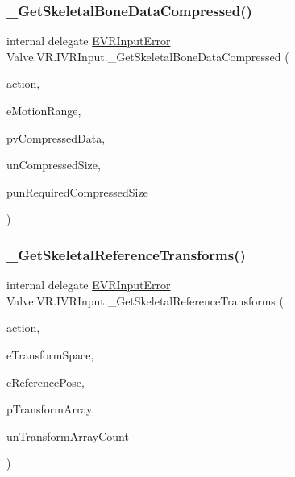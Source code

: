 \mbox{\label{struct_valve_1_1_v_r_1_1_i_v_r_input_ac9cf8a486d0d66c088c2eb33b722111d}} 
\subsubsection{\texorpdfstring{\_GetSkeletalBoneDataCompressed()}{\_GetSkeletalBoneDataCompressed()}}
{\footnotesize\ttfamily internal delegate \mbox{\hyperlink{namespace_valve_1_1_v_r_a592d7f4189b8346d6c96dbdbaa35bc1b}{E\+V\+R\+Input\+Error}} Valve.\+V\+R.\+I\+V\+R\+Input.\+\_\+\+Get\+Skeletal\+Bone\+Data\+Compressed (\begin{DoxyParamCaption}\item[{ulong}]{action,  }\item[{\mbox{\hyperlink{namespace_valve_1_1_v_r_affc8d18345f8f5d36f1ae7b4ce534500}{E\+V\+R\+Skeletal\+Motion\+Range}}}]{e\+Motion\+Range,  }\item[{Int\+Ptr}]{pv\+Compressed\+Data,  }\item[{uint}]{un\+Compressed\+Size,  }\item[{ref uint}]{pun\+Required\+Compressed\+Size }\end{DoxyParamCaption})}

\mbox{\label{struct_valve_1_1_v_r_1_1_i_v_r_input_a1d1f340254e37a3037714eb5ee548afd}} 
\subsubsection{\texorpdfstring{\_GetSkeletalReferenceTransforms()}{\_GetSkeletalReferenceTransforms()}}
{\footnotesize\ttfamily internal delegate \mbox{\hyperlink{namespace_valve_1_1_v_r_a592d7f4189b8346d6c96dbdbaa35bc1b}{E\+V\+R\+Input\+Error}} Valve.\+V\+R.\+I\+V\+R\+Input.\+\_\+\+Get\+Skeletal\+Reference\+Transforms (\begin{DoxyParamCaption}\item[{ulong}]{action,  }\item[{\mbox{\hyperlink{namespace_valve_1_1_v_r_a916744fb3fc7b8e8ba224fba9bee6de4}{E\+V\+R\+Skeletal\+Transform\+Space}}}]{e\+Transform\+Space,  }\item[{\mbox{\hyperlink{namespace_valve_1_1_v_r_a299b655881f873256f035349b59da09e}{E\+V\+R\+Skeletal\+Reference\+Pose}}}]{e\+Reference\+Pose,  }\item[{\mbox{[}\+In, Out\mbox{]} \mbox{\hyperlink{struct_valve_1_1_v_r_1_1_v_r_bone_transform__t}{V\+R\+Bone\+Transform\+\_\+t}} \mbox{[}$\,$\mbox{]}}]{p\+Transform\+Array,  }\item[{uint}]{un\+Transform\+Array\+Count }\end{DoxyParamCaption})}

